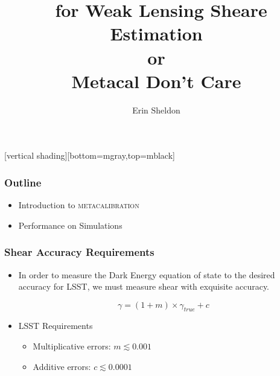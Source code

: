 \documentclass{beamer}
\title{\mcal\ for Weak Lensing Sheare Estimation \\
or\\
Metacal Don't Care}
\author{Erin Sheldon}
\institute{Brookhaven National Laboratory}
\newcommand{\mcal}{\textsc{metacalibration}}
\begin{document}
\frame{\titlepage}


[vertical shading][bottom=mgray,top=mblack]

\frame
{
    \frametitle{Outline}

 
    \begin{itemize}

        \item Introduction to \mcal
        \item Performance on Simulations

    \end{itemize}

}

\frame
{
    \frametitle{Shear Accuracy Requirements}

 
    \begin{itemize}

        \item In order to measure the Dark Energy equation of state
            to the desired accuracy for LSST, we must measure
            shear with exquisite accuracy.

            {\color{lightskyblue}
                \begin{equation}
                    \gamma = (1 + m ) \times \gamma_{true} + c \nonumber
                \end{equation}
            } 

        \item LSST Requirements
            \begin{itemize}
                \item Multiplicative errors: {\color{gold} $m \lesssim 0.001$}
                \item Additive errors: {\color{brightred} $c \lesssim 0.0001$}
            \end{itemize}


    \end{itemize}

}
\end{document}
